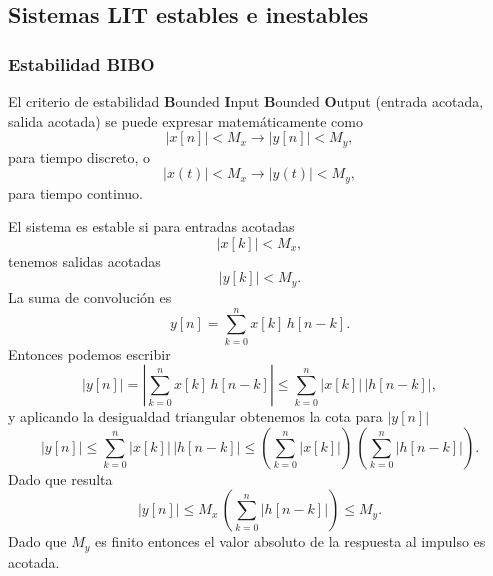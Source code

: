\subsection{Sistemas LIT estables e inestables}

\subsubsection{Estabilidad BIBO}

El criterio de estabilidad \textbf{B}ounded \textbf{I}nput \textbf{B}ounded \textbf{O}utput 
(entrada acotada, salida acotada) se puede expresar matem\'{a}ticamente como 
\begin{equation}
        \left| x\left[ n\right] \right| < M_{x} \rightarrow \left| y\left[ n\right]\right| < M_{y},
\end{equation}
para tiempo discreto, o 
\begin{equation}
        \left| x\left( t\right) \right| < M_{x} \rightarrow \left| y\left( t\right)\right| < M_{y},
\end{equation}
para tiempo continuo.

El sistema es estable si para entradas acotadas 
\begin{equation}
        \left| x\left[ k\right] \right| <M_{x},
\end{equation}
tenemos salidas acotadas 
\begin{equation}
        \left| y\left[ k\right] \right| <M_{y}.
\end{equation}
La suma de convoluci\'{o}n es 
\begin{equation}
        y\left[ n\right] =\sum_{k=0}^nx\left[ k\right] \, h\left[ n-k\right] .
\end{equation}
Entonces podemos escribir 
\begin{equation}
        \left| y\left[ n\right] \right| =
                \left| 
                        \sum_{k=0}^nx\left[ k\right] \, h\left[ n-k\right] 
                \right| \leq 
                \sum_{k=0}^n\left| x\left[ k\right] \right| \, \left| h\left[ n-k\right] \right| ,
\end{equation}
y aplicando la desigualdad triangular obtenemos la cota para $|y[n]|$
\begin{equation}
        \left| y\left[ n\right] \right| 
        \leq 
        \sum_{k=0}^n
                \left| x\left[ k\right]\right| \,
                \left| h\left[ n-k\right] \right| 
        \leq 
        \left( 
                \sum_{k=0}^n\left| x\left[ k\right] \right| 
        \right) \,
        \left( \sum_{k=0}^n\left| h\left[ n-k\right] \right| \right) .
\end{equation}
Dado que resulta
\begin{equation}
        \left| y\left[ n\right] \right| \leq 
        M_{x} \, \left( \sum_{k=0}^n\left| h\left[n-k\right] \right| \right) \leq M_{y}.
\end{equation}
Dado que $M_{y}$ es finito entonces el valor absoluto de la respuesta al impulso es acotada.


